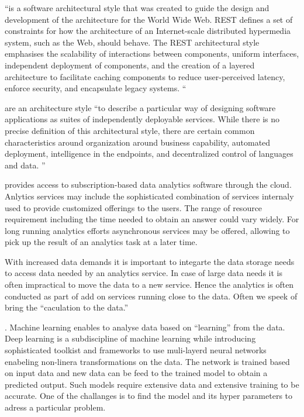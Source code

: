 \begin{description}
{\item[Representational state transfer (REST)]
     ``is a software architectural style that was created to guide the
     design and development of the architecture for the World Wide
     Web. REST defines a set of constraints for how the architecture
     of an Internet-scale distributed hypermedia system, such as the
     Web, should behave. The REST architectural style emphasises the
     scalability of interactions between components, uniform
     interfaces, independent deployment of components, and the
     creation of a layered architecture to facilitate caching
     components to reduce user-perceived latency, enforce security,
     and encapsulate legacy systems.\cite{www-rest} ``

\item[Microservices]
     are an architecture style ``to describe a particular way of
     designing software applications as suites of independently
     deployable services. While there is no precise definition of this
     architectural style, there are certain common characteristics
     around organization around business capability, automated
     deployment, intelligence in the endpoints, and decentralized
     control of languages and data. \cite{www-microservices}''

\item[Analytics as a service]
     provides access to subscription-based data analytics software
     through the cloud. Anlytics services may include the
     sophisticated combination of services internaly used to provide
     customized offerings to the users. The range of resource
     requirement including the time needed to obtain an answer could
     vary widely. For long running analytics efforts asynchronous
     services may be offered, allowing to pick up the result of an
     analytics task at a later time.

\item[Data analytics as a service]
     With increased data demands it is important to integarte the data
     storage needs to access data needed by an analytics service. In
     case of large data needs it is often impractical to move the data
     to a new service. Hence the analytics is often conducted as part
     of add on services running close to the data. Often we speek of
     bring the ``caculation to the data.''

\item[Machine and leep learning].
     Machine learning enables to analyse data based on ``learning''
     from the data. Deep learning is a subdiscipline of machine
     learning while introducing sophisticated toolkist and frameworks
     to use muli-layerd neural networks enabeling non-linera
     transformations on the data. The network is trained based on
     input data and new data can be feed to the trained model to
     obtain a predicted output. Such models require extensive data and
     extensive training to be accurate. One of the challanges is to
     find the model and its hyper parameters to adress a particular
     problem.

}
\end{description}
